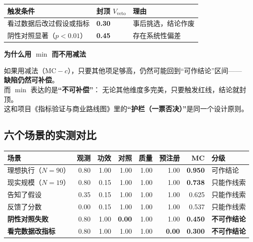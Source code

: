 \documentclass[UTF8,a4paper,11pt]{ctexart}
\newenvironment{explainbox}[1]
{\begin{center}\begin{minipage}{0.94\textwidth}\colorbox{boxbg}{\parbox{0.92\textwidth}{\textbf{#1}\par\vspace{2pt}}}}
{\end{minipage}\end{center}}
\begin{document}
\begin{center}
\begin{tabular}{p{4.6cm}p{3.2cm}p{6.8cm}}
\toprule
\textbf{触发条件} & \textbf{封顶 $V_{\text{veto}}$} & \textbf{理由} \\
\midrule
看过数据后改过假设或指标 & \textbf{0.30} & 事后挑选，结论作废 \\
阴性对照显著（$p<0.01$） & \textbf{0.45} & 存在系统性偏差 \\
\bottomrule
\end{tabular}
\end{center}

\begin{explainbox}{为什么用 $\min$ 而不用减法}
如果用减法（$\text{MC} - c$），只要其他项足够高，仍然可能回到“可作结论”区间——
\textbf{缺陷仍然可补偿}。\\[4pt]
而 $\min$ 表达的是\textbf{“不可补偿”}：
无论其他维度多完美，只要触发红线，结论就封顶。\\[4pt]
这和项目《指标验证与商业路线图》里的\textbf{“护栏（一票否决）”}是同一个设计原则。
\end{explainbox}

\subsection{六个场景的实测对比}

\begin{longtable}{@{}p{4.0cm}rrrrrrl@{}}
\toprule
\textbf{场景} & \textbf{观测} & \textbf{功效} & \textbf{对照} & \textbf{质量} & \textbf{预注册} & \textbf{MC} & \textbf{分级} \\
\midrule
理想执行（$N=90$） & 0.80 & 1.00 & 1.00 & 1.00 & 1.00 & \textbf{0.950} & 可作结论 \\
现实规模（$N=19$） & 0.80 & 0.15 & 1.00 & 1.00 & 1.00 & \textbf{0.738} & 只能作线索 \\
告知了假设 & 0.35 & 0.15 & 1.00 & 1.00 & 1.00 & 0.625 & 只能作线索 \\
反馈了分数 & 0.00 & 0.15 & 1.00 & 1.00 & 1.00 & 0.537 & 只能作线索 \\
\textbf{阴性对照失败} & 0.80 & 1.00 & \textbf{0.00} & 1.00 & 1.00 & \textbf{0.450} & \textbf{不可作结论} \\
\textbf{看完数据改指标} & 0.80 & 1.00 & 1.00 & 1.00 & \textbf{0.00} & \textbf{0.300} & \textbf{不可作结论} \\
\bottomrule
\end{longtable}
\end{document}
